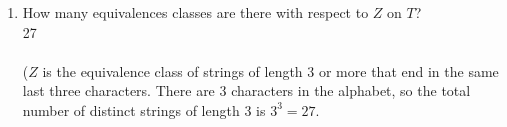 \documentclass[]{exam}
\theoremstyle{definition}
\begin{document}
\begin{questions}
\begin{enumerate}[label=\alph*)]
\item How many equivalences classes are there with respect to $Z$ on $T$?
\\
27
\\~\\
($Z$ is the equivalence class of strings of length $3$ or more that end in
the same last three characters. There are $3$ characters in the alphabet,
so the total number of distinct strings of length $3$ is $3^3 = 27$.
\end{enumerate}


\end{questions}
\end{document}
